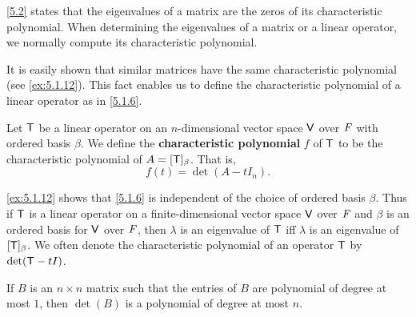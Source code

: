 \begin{note}
  \cref{5.2} states that the eigenvalues of a matrix are the zeros of its characteristic polynomial.
  When determining the eigenvalues of a matrix or a linear operator, we normally compute its characteristic polynomial.
\end{note}

\begin{note}
  It is easily shown that similar matrices have the same characteristic polynomial (see \cref{ex:5.1.12}).
  This fact enables us to define the characteristic polynomial of a linear operator as in \cref{5.1.6}.
\end{note}

\begin{defn}\label{5.1.6}
  Let \(\mathsf{T}\) be a linear operator on an \(n\)-dimensional vector space \(\mathsf{V}\) over \(\mathit{F}\) with ordered basis \(\beta\).
  We define the \textbf{characteristic polynomial} \(f\) of \(\mathsf{T}\) to be the characteristic polynomial of \(A = [\mathsf{T}]_{\beta}\).
  That is,
  \[
    f(t) = \det(A - t I_n).
  \]
\end{defn}

\begin{note}
  \cref{ex:5.1.12} shows that \cref{5.1.6} is independent of the choice of ordered basis \(\beta\).
  Thus if \(\mathsf{T}\) is a linear operator on a finite-dimensional vector space \(\mathsf{V}\) over \(\mathit{F}\) and \(\beta\) is an ordered basis for \(\mathsf{V}\) over \(\mathit{F}\), then \(\lambda\) is an eigenvalue of \(\mathsf{T}\) iff \(\lambda\) is an eigenvalue of \([\mathsf{T}]_{\beta}\).
  We often denote the characteristic polynomial of an operator \(\mathsf{T}\) by \(\det(\mathsf{T} - tI)\).
\end{note}

\begin{lem}\label{5.1.7}
  If \(B\) is an \(n \times n\) matrix such that the entries of \(B\) are polynomial of degree at most \(1\), then \(\det(B)\) is a polynomial of degree at most \(n\).
\end{lem}

